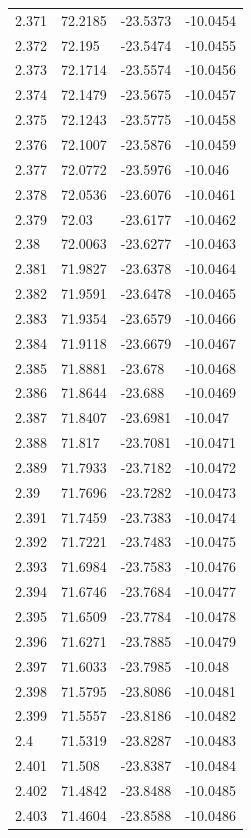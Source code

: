 \begin{tabular}{llll}
2.371 & 72.2185 & -23.5373 & -10.0454 \\
2.372 & 72.195 & -23.5474 & -10.0455 \\
2.373 & 72.1714 & -23.5574 & -10.0456 \\
2.374 & 72.1479 & -23.5675 & -10.0457 \\
2.375 & 72.1243 & -23.5775 & -10.0458 \\
2.376 & 72.1007 & -23.5876 & -10.0459 \\
2.377 & 72.0772 & -23.5976 & -10.046 \\
2.378 & 72.0536 & -23.6076 & -10.0461 \\
2.379 & 72.03 & -23.6177 & -10.0462 \\
2.38 & 72.0063 & -23.6277 & -10.0463 \\
2.381 & 71.9827 & -23.6378 & -10.0464 \\
2.382 & 71.9591 & -23.6478 & -10.0465 \\
2.383 & 71.9354 & -23.6579 & -10.0466 \\
2.384 & 71.9118 & -23.6679 & -10.0467 \\
2.385 & 71.8881 & -23.678 & -10.0468 \\
2.386 & 71.8644 & -23.688 & -10.0469 \\
2.387 & 71.8407 & -23.6981 & -10.047 \\
2.388 & 71.817 & -23.7081 & -10.0471 \\
2.389 & 71.7933 & -23.7182 & -10.0472 \\
2.39 & 71.7696 & -23.7282 & -10.0473 \\
2.391 & 71.7459 & -23.7383 & -10.0474 \\
2.392 & 71.7221 & -23.7483 & -10.0475 \\
2.393 & 71.6984 & -23.7583 & -10.0476 \\
2.394 & 71.6746 & -23.7684 & -10.0477 \\
2.395 & 71.6509 & -23.7784 & -10.0478 \\
2.396 & 71.6271 & -23.7885 & -10.0479 \\
2.397 & 71.6033 & -23.7985 & -10.048 \\
2.398 & 71.5795 & -23.8086 & -10.0481 \\
2.399 & 71.5557 & -23.8186 & -10.0482 \\
2.4 & 71.5319 & -23.8287 & -10.0483 \\
2.401 & 71.508 & -23.8387 & -10.0484 \\
2.402 & 71.4842 & -23.8488 & -10.0485 \\
2.403 & 71.4604 & -23.8588 & -10.0486 \\

\end{tabular}
